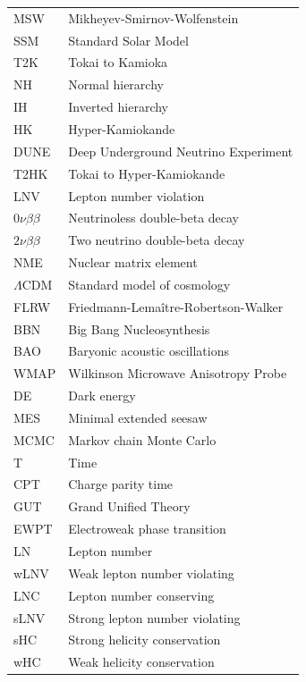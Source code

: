 \begin{longtable}[l]{p{}p{}}
    MSW                     & Mikheyev-Smirnov-Wolfenstein \\
    SSM                     & Standard Solar Model \\
    T2K                     & Tokai to Kamioka \\
    NH                      & Normal hierarchy \\
    IH                      & Inverted hierarchy \\
    HK                      & Hyper-Kamiokande \\
    DUNE                    & Deep Underground Neutrino Experiment \\
    T2HK                    & Tokai to Hyper-Kamiokande \\
    LNV                     & Lepton number violation\\
    $0\nu\beta\beta$        & Neutrinoless double-beta decay\\
    $2\nu\beta\beta$        & Two neutrino double-beta decay\\
    NME                     & Nuclear matrix element\\
    $\Lambda\mathrm{CDM}$   & Standard model of cosmology \\
    FLRW                    & Friedmann-Lema\^{i}tre-Robertson-Walker \\
    BBN                     & Big Bang Nucleosynthesis \\
    BAO                     & Baryonic acoustic oscillations \\
    WMAP                    & Wilkinson Microwave Anisotropy Probe\\
    DE                      & Dark energy \\
    MES                     & Minimal extended seesaw \\
    MCMC                    & Markov chain Monte Carlo \\
    T                       & Time \\
    CPT                     & Charge parity time \\
    GUT                     & Grand Unified Theory \\
    EWPT                    & Electroweak phase transition \\
    LN                      & Lepton number \\
    wLNV                    & Weak lepton number violating \\
    LNC                     & Lepton number conserving \\
    sLNV                    & Strong lepton number violating \\
    sHC                     & Strong helicity conservation \\
    wHC                     & Weak helicity conservation 
    
 
\end{longtable}







